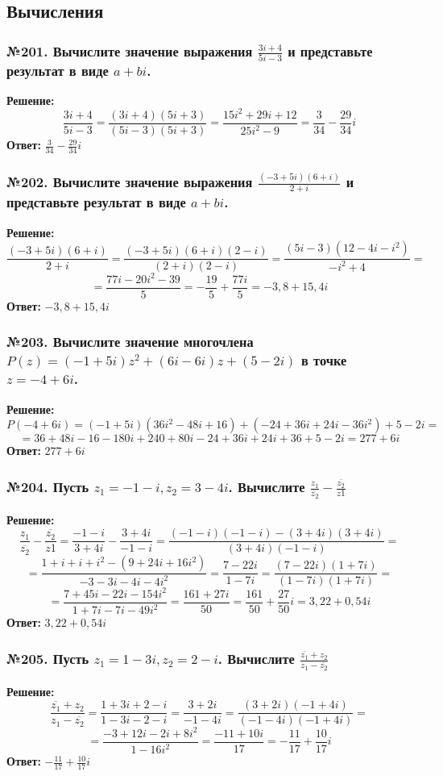 \documentclass[a4paper]{article}
\begin{document}
\subsection*{Вычисления}
\subsubsection*{№201. Вычислите значение выражения $\frac{3i+4}{5i-3}$ и представьте результат в виде $a+bi$.}
\textbf{Решение:}
\[\frac{3i+4}{5i-3}=\frac{(3i+4)(5i+3)}{(5i-3)(5i+3)}=\frac{15i^2+29i+12}{25i^2-9}=\frac{3}{34}-\frac{29}{34}i\]
\textbf{Ответ:} $\frac{3}{34}-\frac{29}{34}i$

\subsubsection*{№202. Вычислите значение выражения $\frac{(-3+5i)(6+i)}{2+i}$ и представьте результат в виде $a+bi$.}
\textbf{Решение:}
\[\frac{(-3+5i)(6+i)}{2+i}=\frac{(-3+5i)(6+i)(2-i)}{(2+i)(2-i)}=\frac{(5i-3)(12-4i-i^2)}{-i^2+4}=\]
\[=\frac{77i-20i^2-39}{5}=-\frac{19}{5}+\frac{77i}{5}=-3,8+15,4i\]
\textbf{Ответ:}  $-3,8+15,4i$

\subsubsection*{№203. Вычислите значение многочлена $P(z)=(-1+5i)z^2+(6i-6i)z+(5-2i)$ в точке $z=-4+6i$. }
\textbf{Решение:}
\[P(-4+6i)=(-1+5i)(36i^2-48i+16)+(-24+36i+24i-36i^2)+5-2i=\]
\[=36+48i-16-180i+240+80i-24+36i+24i+36+5-2i=277+6i\]
\textbf{Ответ:} $277+6i$

\subsubsection*{№204. Пусть $z_1=-1-i, z_2=3-4i$. Вычислите $\displaystyle \frac{z_1}{\overline{z_2}}-\frac{\overline{z_2}}{z1}$}
\textbf{Решение:}
\[\frac{z_1}{\overline {z_2}}-\frac{\overline {z_2}}{z1}=\frac{-1-i}{3+4i}-\frac{3+4i}{-1-i}=\frac{(-1-i)(-1-i)-(3+4i)(3+4i)}{(3+4i)(-1-i)}=\]
\[=\frac{1+i+i+i^2-(9+24i+16i^2)}{-3-3i-4i-4i^2}=\frac{7-22i}{1-7i}=\frac{(7-22i)(1+7i)}{(1-7i)(1+7i)}=\]
\[=\frac{7+45i-22i-154i^2}{1+7i-7i-49i^2}=\frac{161+27i}{50}=\frac{161}{50}+\frac{27}{50}i=3,22+0,54i\]
\textbf{Ответ:} $3,22+0,54i$

\subsubsection*{№205. Пусть $z_1=1-3i, z_2=2-i$. Вычислите $\displaystyle \frac{\overline {z_1}+z_2}{z_1-\overline{z_2}}$}
\textbf{Решение:}
\[\frac{\overline {z_1}+z_2}{z_1-\overline{z_2}}=\frac{1+3i+2-i}{1-3i-2-i}=\frac{3+2i}{-1-4i}=\frac{(3+2i)(-1+4i)}{(-1-4i)(-1+4i)}=\]
\[=\frac{-3+12i-2i+8i^2}{1-16i^2}=\frac{-11+10i}{17}=-\frac{11}{17}+\frac{10}{17}i\] 
\textbf{Ответ:} $-\frac{11}{17}+\frac{10}{17}i$
\end{document}
